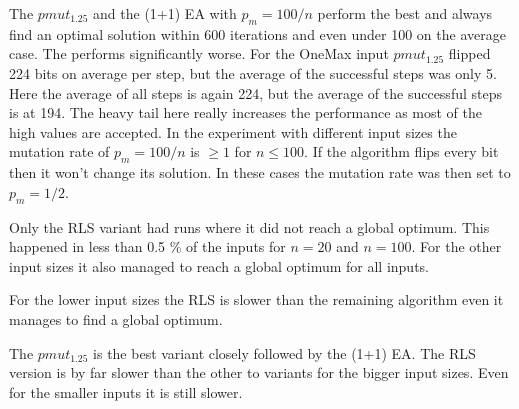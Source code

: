 

The $pmut_1.25$ and the (1+1) EA with $p_m=100/n$ perform the best and always find an optimal solution within 600 iterations and even under 100 on the average case.
The \RLSN[4] performs significantly worse.
For the OneMax input $pmut_1.25$ flipped 224 bits on average per step, but the average of the successful steps was only 5.
Here the average of all steps is again 224, but the average of the successful steps is at 194.
The heavy tail here really increases the performance as most of the high values are accepted.
In the experiment with different input sizes the mutation rate of $p_m=100/n$ is $\ge1$ for $n\le100$.
If the algorithm flips every bit then it won't change its solution.
In these cases the mutation rate was then set to $p_m=1/2$.



Only the RLS variant had runs where it did not reach a global optimum.
This happened in less than 0.5 \% of the inputs for $n=20$ and $n=100$.
For the other input sizes it also managed to reach a global optimum for all inputs.



For the lower input sizes the RLS is slower than the remaining algorithm even it manages to find a global optimum.



The $pmut_{1.25}$ is the best variant closely followed by the (1+1) EA.
The RLS version is by far slower than the other to variants for the bigger input sizes.
Even for the smaller inputs it is still slower.
